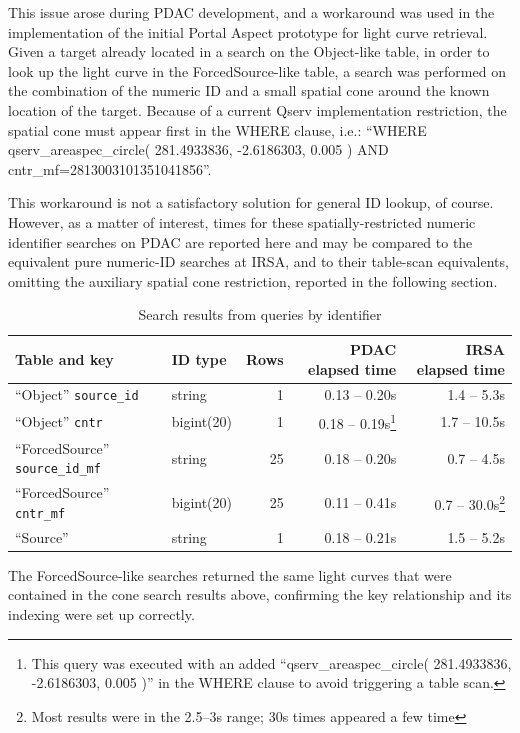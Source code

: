 \documentclass[DM,lsstdraft,STR,toc]{lsstdoc}
\begin{document}
This issue arose during PDAC development,
and a workaround was used in the implementation of the initial Portal Aspect prototype for light curve retrieval.
Given a target already located in a search on the Object-like table,
in order to look up the light curve in the ForcedSource-like table, 
a search was performed on the combination of the numeric ID and a small spatial cone around the known location of the target.
Because of a current Qserv implementation restriction,
the spatial cone must appear first in the WHERE clause, i.e.:
``WHERE qserv\_areaspec\_circle( 281.4933836, -2.6186303, 0.005 ) AND cntr\_mf=2813003101351041856''.

This workaround is not a satisfactory solution for general ID lookup, of course.
However, as a matter of interest,
times for these spatially-restricted numeric identifier searches on PDAC are reported here and may be compared to the equivalent pure numeric-ID searches at IRSA,
and to their table-scan equivalents, omitting the auxiliary spatial cone restriction,
reported in the following section.

\begin{table}[h]
\centering
\begin{tabular}{l l r r r}
Table and key & ID type & Rows & PDAC elapsed time & IRSA elapsed time \\ \hline
``Object'' \verb|source_id| & string & 1 & 0.13 -- 0.20s & 1.4 -- 5.3s \\
``Object'' \verb|cntr| & bigint(20) & 1 & 0.18 -- 0.19s\footnote{This query was executed with an added ``qserv\_areaspec\_circle( 281.4933836, -2.6186303, 0.005 )'' in the WHERE clause to avoid triggering a table scan.} & 1.7 -- 10.5s \\  %
``ForcedSource'' \verb|source_id_mf| & string & 25 & 0.18 -- 0.20s & 0.7 -- 4.5s \\
``ForcedSource'' \verb|cntr_mf| & bigint(20) & 25 & 0.11 -- 0.41s\footnotemark[4] & 0.7 -- 30.0s\footnote{Most results were in the 2.5--3s range; 30s times appeared a few time } \\
``Source'' & string & 1 & 0.18 -- 0.21s & 1.5 -- 5.2s \\
\end{tabular}
\caption{Search results from queries by identifier}
\label{tab:idresults}
\end{table}

The ForcedSource-like searches returned the same light curves that were contained in the cone search results above, confirming the key relationship and its indexing were set up correctly.
\end{document}
